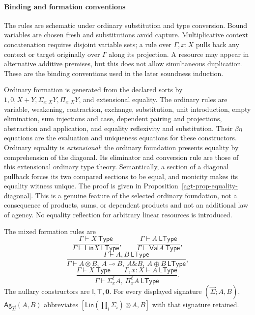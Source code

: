 \documentclass[11pt,a4paper]{article}
\numberwithin{equation}{section}
\theoremstyle{definition}
\theoremstyle{remark}
\theoremstyle{plain}
\providecommand{\Ag}{\mathsf{Ag}}
\providecommand{\sig}{\vec{\Sigma}}
\providecommand{\Lin}{\mathsf{Lin}}
\providecommand{\Val}{\mathsf{Val}}
\providecommand{\I}{\mathsf{I}}
\providecommand{\Top}{\top}
\providecommand{\botell}{\mathbf{0}}
\providecommand{\ordturn}{\vdash}
\providecommand{\ltype}{\mathsf{LType}}
\providecommand{\type}{\mathsf{Type}}
\begin{document}
\paragraph{Binding and formation conventions}

The rules are schematic under ordinary substitution and type
conversion. Bound variables are chosen fresh and substitutions avoid
capture. Multiplicative context concatenation requires disjoint
variable sets; a rule over $\Gamma,x:X$ pulls back any context or target
originally over $\Gamma$ along its projection. A resource may appear
in alternative additive premises, but this does not allow simultaneous
duplication. These are the binding conventions
used in the later soundness induction.

Ordinary formation is generated from the declared sorts by
$1,0,X+Y,\Sigma_{x:X}Y,\Pi_{x:X}Y$, and extensional equality.
The ordinary rules are variable, weakening, contraction, exchange,
substitution, unit introduction, empty elimination, sum injections and case,
dependent pairing and projections, abstraction and application, and equality
reflexivity and substitution. Their $\beta\eta$ equations are the
evaluation and uniqueness equations for these constructors.
Ordinary equality is \emph{extensional}: the ordinary foundation presents
equality by comprehension of the diagonal. Its eliminator and conversion rule
are those of this extensional ordinary type theory.  Semantically, a section
of a diagonal pullback forces its two compared sections to be equal, and
monicity makes its equality witness unique.  The proof is given in
Proposition~\ref{agt-prop-equality-diagonal}.  This is a genuine feature of
the selected ordinary foundation, not a consequence of products, sums, or
dependent products and not an additional law of agency.  No equality
reflection for arbitrary linear resources is introduced.

The mixed formation rules are
\[
 \frac{\Gamma\ordturn X\ \type}{\Gamma\vdash\Lin X\ \ltype},
 \qquad
 \frac{\Gamma\vdash A\ \ltype}{\Gamma\ordturn\Val A\ \type},
\]
\[
 \frac{\Gamma\vdash A,B\ \ltype}
      {\Gamma\vdash A\otimes B,\ A\multimap B,\ A\mathbin{\&}B,
                   \ A\oplus B\ \ltype},
\]
\[
 \frac{\Gamma\ordturn X\ \type\qquad\Gamma,x:X\vdash A\ \ltype}
      {\Gamma\vdash\Sigma_x^\ell A,\ \Pi_x^\ell A\ \ltype}.
\]
The nullary constructors are $\I,\Top,\botell$. For every displayed
signature $(\sig;A,B)$, $\Ag_{\sig}(A,B)$ abbreviates
$[\Lin(\prod_i\Sigma_i)\otimes A,B]$ with that signature retained.
\end{document}
